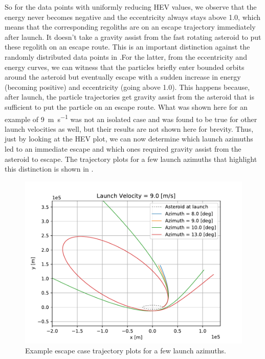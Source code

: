So for the data points with uniformly reducing \gls{HEV} values, we observe that the energy never becomes negative and the eccentricity always stays above 1.0, which means that the corresponding regoliths are on an escape trajectory immediately after launch. It doesn't take a gravity assist from the fast rotating asteroid to put these regolith on an escape route. This is an important distinction against the randomly distributed data points in .For the latter, from the eccentricity and energy curves, we can witness that the particles briefly enter bounded orbits around the asteroid but eventually escape with a sudden increase in energy (becoming positive) and eccentricity (going above 1.0). This happens because, after launch, the particle trajectories get gravity assist from the asteroid that is sufficient to put the particle on an escape route. What was shown here for an example of \SI{9}{\metre\per\second} was not an isolated case and was found to be true for other launch velocities as well, but their results are not shown here for brevity. Thus, just by looking at the \gls{HEV} plot, we can now determine which launch azimuths led to an immediate escape and which ones required gravity assist from the asteroid to escape. The trajectory plots for a few launch azimuths that highlight this distinction is shown in .
\begin{figure}[htb]
\centering
\captionsetup{justification=centering}
\includegraphics[width=\textwidth, height=0.3\textheight, keepaspectratio=true]{Images/longest_edge_no_perturbations/9ms_escape_example_trajectories.pdf}
\caption{Example escape case trajectory plots for a few launch azimuths.}
\label{fig:escape_example_traj_9ms_noSP}
\end{figure}
